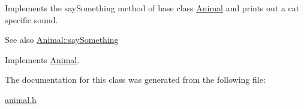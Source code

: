 Implements the say\+Something method of base class \hyperlink{classAnimal}{Animal} and prints out a cat specific sound.

\begin{DoxySeeAlso}{See also}
\hyperlink{classAnimal_a1da8e52d19af5bd43a3755d9d5454598}{Animal\+::say\+Something} 
\end{DoxySeeAlso}


Implements \hyperlink{classAnimal_a1da8e52d19af5bd43a3755d9d5454598}{Animal}.



The documentation for this class was generated from the following file\+:\begin{DoxyCompactItemize}
\item 
\hyperlink{animal_8h}{animal.\+h}\end{DoxyCompactItemize}
